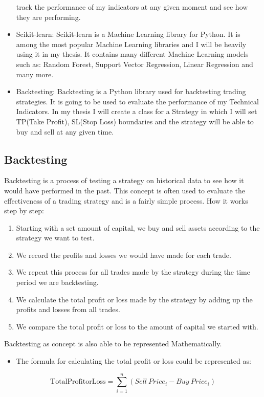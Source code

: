 \documentclass{imc-inf}
\begin{document}
\begin{itemize}
		track the performance of my indicators at any given moment and see how they are performing.
		\item Scikit-learn: Scikit-learn is a Machine Learning library for Python. It is among the most popular Machine Learning libraries and
		I will be heavily using it in my thesis. It contains many different Machine Learning models such as: Random Forest, Support Vector Regression, Linear Regression and many more.
		\item Backtesting: Backtesting is a Python library used for backtesting trading strategies. It is going to be used to evaluate the performance of my Technical Indicators.
		In my thesis I will create a class for a Strategy in which I will set TP(Take Profit), SL(Stop Loss) boundaries and the strategy will be able to buy and sell at any given time.
	\end{itemize}
	
	\subsection{Backtesting}
	Backtesting is a process of testing a strategy\cite{what_is_backtesting} on historical data to see how it would have performed in the past. 
	This concept is often used to evaluate the effectiveness of a trading strategy and is a fairly simple process. 
	How it works step by step:
	\begin{enumerate}
		\item Starting with a set amount of capital, we buy and sell assets according to the strategy we want to test.
		\item We record the profits and losses we would have made for each trade.
		\item We repeat this process for all trades made by the strategy during the time period we are backtesting.
		\item We calculate the total profit or loss made by the strategy by adding up the profits and losses from all trades.
		\item We compare the total profit or loss to the amount of capital we started with.
	\end{enumerate}
	
	Backtesting as concept is also able to be represented Mathematically.
	
	\begin{itemize}
		\item The formula for calculating the total profit or loss could be represented as:
	\end{itemize}
	\begin{equation}
		\mathrm{Total Profit or Loss} = \sum_{i=1}^{n} (Sell\ Price_i - Buy\ Price_i)
	\end{equation}
	
\end{document}
